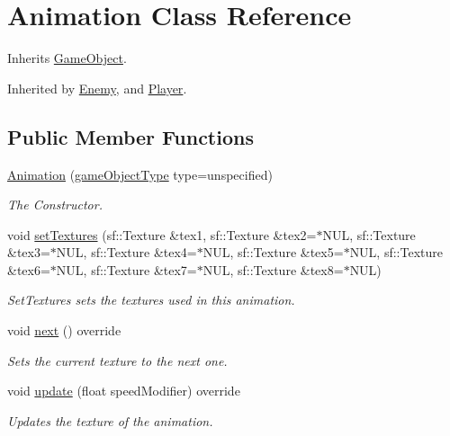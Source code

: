 \hypertarget{class_animation}{\section{Animation Class Reference}
\label{class_animation}
}


Inherits \hyperlink{class_game_object}{Game\+Object}.



Inherited by \hyperlink{class_enemy}{Enemy}, and \hyperlink{class_player}{Player}.

\subsection*{Public Member Functions}
\begin{DoxyCompactItemize}
\item 
\hyperlink{class_animation_a9bea96e39c72451d91d8c33f48ef194c}{Animation} (\hyperlink{class_game_object_ad5092169e581fb0772e01026882ea0c8}{game\+Object\+Type} type=unspecified)
\begin{DoxyCompactList}\small\item\em The Constructor. \end{DoxyCompactList}\item 
void \hyperlink{class_animation_ab63fd2f5810a27e1b61f43f19e8994c6}{set\+Textures} (sf\+::\+Texture \&tex1, sf\+::\+Texture \&tex2=$\ast$N\+U\+L, sf\+::\+Texture \&tex3=$\ast$N\+U\+L, sf\+::\+Texture \&tex4=$\ast$N\+U\+L, sf\+::\+Texture \&tex5=$\ast$N\+U\+L, sf\+::\+Texture \&tex6=$\ast$N\+U\+L, sf\+::\+Texture \&tex7=$\ast$N\+U\+L, sf\+::\+Texture \&tex8=$\ast$N\+U\+L)
\begin{DoxyCompactList}\small\item\em Set\+Textures sets the textures used in this animation. \end{DoxyCompactList}\item 
void \hyperlink{class_animation_ad85bc33848adb3aa539f560552fa36ba}{next} () override
\begin{DoxyCompactList}\small\item\em Sets the current texture to the next one. \end{DoxyCompactList}\item 
void \hyperlink{class_animation_ae17ebf5f4b47801e460eb63342d858e8}{update} (float speed\+Modifier) override
\begin{DoxyCompactList}\small\item\em Updates the texture of the animation. \end{DoxyCompactList}\item 

\end{DoxyCompactItemize}
